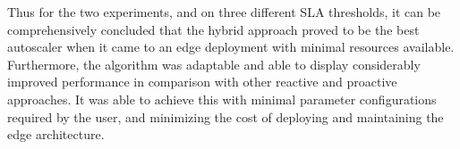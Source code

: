 Thus for the two experiments, and on three different SLA thresholds, it can be comprehensively concluded that the hybrid approach proved to be the best autoscaler when it came to an edge deployment with minimal resources available. Furthermore, the algorithm was adaptable and able to display considerably improved performance in comparison with other reactive and proactive approaches. It was able to achieve this with minimal parameter configurations required by the user, and minimizing the cost of deploying and maintaining the edge architecture.
